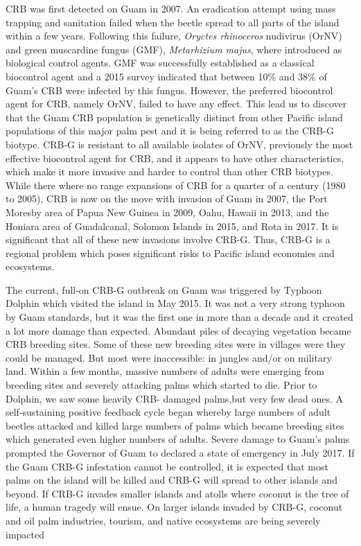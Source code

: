 \documentclass[14pt,english,letterpaper]{scrartcl}
\begin{document}
CRB was first detected on Guam in 2007. An eradication attempt using mass
trapping and sanitation failed when the beetle spread to all parts of the island within a few years. Following this failure, \textit{Oryctes
rhinoceros} nudivirus (OrNV) and green muscardine fungus (GMF), \textit{Metarhizium majus}, where
introduced as biological control agents. GMF was successfully established as a classical biocontrol agent and a 2015 survey
indicated that between 10\% and 38\% of Guam's CRB were infected by this fungus. However, the
preferred biocontrol agent for CRB, namely OrNV, failed to have any effect. This lead us to
discover that the Guam CRB population is genetically distinct from other Pacific island populations of this major palm pest and it is being
referred to as the CRB-G biotype. CRB-G is resistant to all available isolates of OrNV, previously
the most effective biocontrol agent for CRB, and it appears to have other characteristics, which
make it more invasive and harder to control than other CRB biotypes. While there where no
range expansions of CRB for a quarter of a century (1980 to 2005), CRB is now on the move with
invasion of Guam in 2007, the Port Moresby area of Papua New Guinea in 2009, Oahu,
Hawaii in 2013, and the Honiara area of Guadalcanal, Solomon Islands in 2015, and Rota in
2017. It is significant that all of these new invasions involve CRB-G. Thus, CRB-G is a regional
problem which poses significant risks to Pacific island economies and ecosystems.

The current, full-on CRB-G outbreak on Guam was triggered by Typhoon Dolphin which visited
the island in May 2015. It was not a very strong typhoon by Guam standards, but it was the first
one in more than a decade and it created a lot more damage than expected. Abundant piles of
decaying vegetation became CRB breeding sites. Some of these new breeding sites were in
villages were they could be managed. But most were inaccessible: in jungles and/or on military
land. Within a few months, massive numbers of adults were emerging from breeding sites and
severely attacking palms which started to die. Prior to Dolphin, we saw some heavily CRB-
damaged palms,but very few dead ones. A self-sustaining positive feedback cycle began
whereby large numbers of adult beetles attacked and killed large numbers of palms which
became breeding sites which generated even higher numbers of adults. Severe damage to
Guam’s palms prompted the Governor of Guam to declared a state of emergency in July 2017. If
the Guam CRB-G infestation cannot be controlled, it is expected that most palms on the island
will be killed and CRB-G will spread to other islands and beyond. If CRB-G invades smaller
islands and atolls where coconut is the tree of life, a human tragedy will ensue. On larger
islands invaded by CRB-G, coconut and oil palm industries, tourism, and native ecosystems are being severely
impacted
\end{document}
